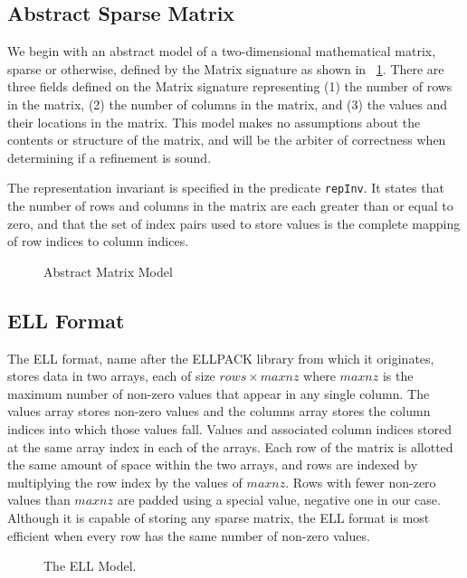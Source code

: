 \subsection{Abstract Sparse Matrix}

We begin with an abstract model of a two-dimensional mathematical matrix, sparse or otherwise, defined by the Matrix signature as shown in \figurename~\ref{model:abstract}.  There are three fields defined on the Matrix signature representing (1) the number of rows in the matrix, (2) the number of columns in the matrix, and (3) the values and their locations in the matrix.  This model makes no assumptions about the contents or structure of the matrix, and will be the arbiter of correctness when determining if a refinement is sound.

The representation invariant is specified in the predicate \texttt{repInv}.  It states that the number of rows and columns in the matrix are each greater than or equal to zero, and that the set of index pairs used to store values is the complete mapping of row indices to column indices.

\begin{figure}

\caption{Abstract Matrix Model}
\label{model:abstract}
\end{figure}

\subsection{ELL Format}

The ELL format, name after the ELLPACK library from which it originates, stores data in two arrays, each of size $rows\times maxnz$ where $maxnz$ is the maximum number of non-zero values that appear in any single column.  The values array stores non-zero values and the columns array stores the column indices into which those values fall.  Values and associated column indices stored at the same array index in each of the arrays.  Each row of the matrix is allotted the same amount of space within the two arrays, and rows are indexed by multiplying the row index by the values of $maxnz$.  Rows with fewer non-zero values than $maxnz$ are padded using a special value, negative one in our case.  Although it is capable of storing any sparse matrix, the ELL format is most efficient when every row has the same number of non-zero values.

\begin{figure}

\caption{The ELL Model.}
\label{model:ell}
\end{figure} 

